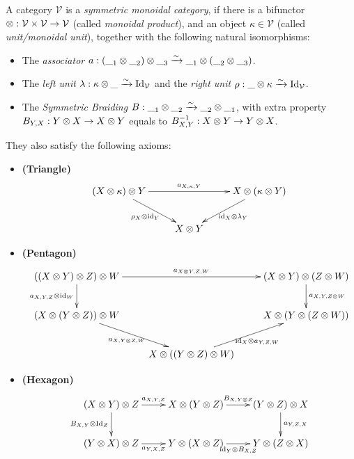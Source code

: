 \documentclass{article}
\begin{document}
\begin{defn}\label{defn_symmon}
    A category $\mathcal{V}$ is a \emph{symmetric monoidal category}, if there is a bifunctor $\otimes:\mathcal{V}\times\mathcal{V}\rightarrow\mathcal{V}$ (called \emph{monoidal product}), and an object $\kappa\in\mathcal{V}$ (called \emph{unit/monoidal unit}), together with the following natural isomorphisms:
    \begin{itemize}
        \item The \emph{associator} $a:(\_ _1\otimes \_ _2)\otimes \_ _3 \xrightarrow{\sim} \_ _1\otimes(\_ _2\otimes \_ _3)$.
        \item The \emph{left unit} $\lambda:\kappa\otimes\_\xrightarrow{\sim} \mathrm{Id}_{\mathcal{V}}$ and the \emph{right unit} $\rho:\_\otimes \kappa\xrightarrow{\sim}\mathrm{Id}_\mathcal{V}$.
        \item The \emph{Symmetric Braiding} $B:\_ _1\otimes\_ _2\xrightarrow{\sim}\_ _2\otimes\_ _1$, with extra property $B_{Y,X}:Y\otimes X\rightarrow X\otimes Y$ equals to $B_{X,Y}^{-1}:X\otimes Y\rightarrow Y\otimes X$.
    \end{itemize} 

    They also satisfy the following axioms:
    \begin{itemize}
        \item \textbf{(Triangle)}
        \[\xymatrix{
            (X\tensor \kappa)\tensor Y \ar[dr]_-{\rho_X \tensor \id_Y} \ar[rr]^-{a_{X,\kappa,Y}} && X\tensor (\kappa\tensor Y) \ar[dl]^-{\id_X\tensor \lambda_Y}\\
            & X\tensor Y
        }\]
        \item \textbf{(Pentagon)}
        \[\xymatrix{
            ((X\tensor Y)\tensor Z)\tensor W \ar[rr]^-{a_{X\tensor Y,Z,W}} \ar[d]_-{a_{X,Y,Z}\tensor \id_W} && (X\tensor Y)\tensor(Z\tensor W) \ar[d]^-{a_{X,Y,Z\tensor W}}\\
            (X\tensor (Y\tensor Z))\tensor W \ar[dr]_-{a_{X,Y\tensor Z,W}} && X\tensor (Y\tensor (Z\tensor W)) \\
            & X\tensor ((Y\tensor Z)\tensor W) \ar[ur]_-{\id_X\tensor a_{Y,Z,W}}
        }\]
        \item \textbf{(Hexagon)}
        \[\xymatrix{
            (X\tensor Y)\tensor Z \ar[r]^-{a_{X,Y,Z}} \ar[d]_-{B_{X,Y}\tensor \Id_Z} & X\tensor (Y\tensor Z)\ar[r]^-{B_{X,Y\tensor Z}} & (Y\tensor Z)\tensor X \ar[d]^-{a_{Y,Z,X}}\\
            (Y\tensor X)\tensor Z \ar[r]_-{a_{Y,X,Z}} & Y\tensor (X\tensor Z) \ar[r]_-{\id_Y\tensor B_{X,Z}} & Y\tensor (Z\tensor X)
        }\]
    \end{itemize}
\end{defn}
\end{document}
